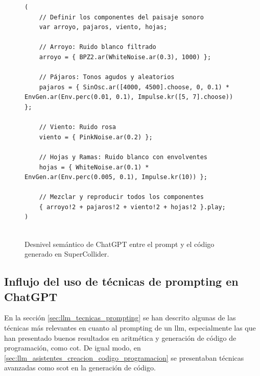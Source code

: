 \begin{figure}[H]
    \caption[Desnivel semántico de ChatGPT entre el prompt y el código generado en SuperCollider]{Desnivel semántico de ChatGPT entre el prompt y el código generado en SuperCollider.}
    \centering
    \begin{lstlisting}[style=SuperCollider-IDE, basicstyle=\footnotesize\ttfamily, numbers=none]
(
    // Definir los componentes del paisaje sonoro
    var arroyo, pajaros, viento, hojas;
    
    // Arroyo: Ruido blanco filtrado
    arroyo = { BPZ2.ar(WhiteNoise.ar(0.3), 1000) };
    
    // Pájaros: Tonos agudos y aleatorios
    pajaros = { SinOsc.ar([4000, 4500].choose, 0, 0.1) * EnvGen.ar(Env.perc(0.01, 0.1), Impulse.kr([5, 7].choose)) };
    
    // Viento: Ruido rosa
    viento = { PinkNoise.ar(0.2) };
    
    // Hojas y Ramas: Ruido blanco con envolventes
    hojas = { WhiteNoise.ar(0.1) * EnvGen.ar(Env.perc(0.005, 0.1), Impulse.kr(10)) };
    
    // Mezclar y reproducir todos los componentes
    { arroyo!2 + pajaros!2 + viento!2 + hojas!2 }.play;
)
            
    \end{lstlisting}
    \source{\propio}
    \label{fig:ChatGPT_desnivel_semantico}
\end{figure}



\subsection{Influjo del uso de técnicas de {prompting} en ChatGPT}

En la sección \ref{sec:llm_tecnicas_prompting} se han descrito algunas de las técnicas más relevantes en cuanto al prompting de un \gls{llm}, especialmente las que han presentado buenos resultados en aritmética y generación de código de programación, como \gls{cot}. De igual modo, en \ref{sec:llm_asistentes_creacion_codigo_programacion} se presentaban técnicas avanzadas como \gls{scot} en la generación de código.

